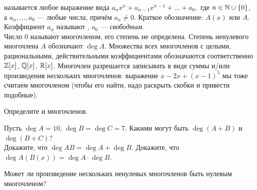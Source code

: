 \documentclass[a4paper,12pt]{article}
\newcommand{\0}[1]{\overline{#1}}
\begin{document}


 
называется любое выражение вида\break
$
a_nx^n + a_{n-1}x^{n-1} + \dots  + a_0,  %
$
где
$n\in\mathbb{N}\cup\{0\}$,
а 
$a_n,\dots ,a_0$ --- любые числа, прич\"ем $a_n\ne0$.
Краткое обозначение: $A(x)$ или $A$. Коэффициент $a_n$ называют
, $a_0$ --- {\em свободным}.\\
Число 0 называют  многочленом, его степень не определена.
Степень ненулевого многочлена $A$ обозначают $\deg A$.
Множества всех многочленов с целыми, рациональными, действительными коэффициентами обозначаются соответственно $\mathbb{Z}[x]$, $\mathbb{Q}[x]$, $\mathbb{R}[x]$.
Многочлен разрешается записывать в виде суммы и/или произведения нескольких многочленов: выражение $x-2x+(x-1)^5$ мы тоже считаем многочленом (чтобы его найти, надо раскрыть скобки и привести подобные).

Определите  и  многочленов.

 
 Пусть $\deg A=10$, $\deg B=\deg C=7$. Какими могут быть
$\deg(A+B)$ и $\deg(B+C)$?\\
 Докажите, что $\deg AB=\deg A+\deg B.$
 Докажите, что $\deg A(B(x))=\deg A\cdot \deg B$.

 Может ли произведение нескольких ненулевых многочленов
быть нулевым многочленом?







\end{document}
